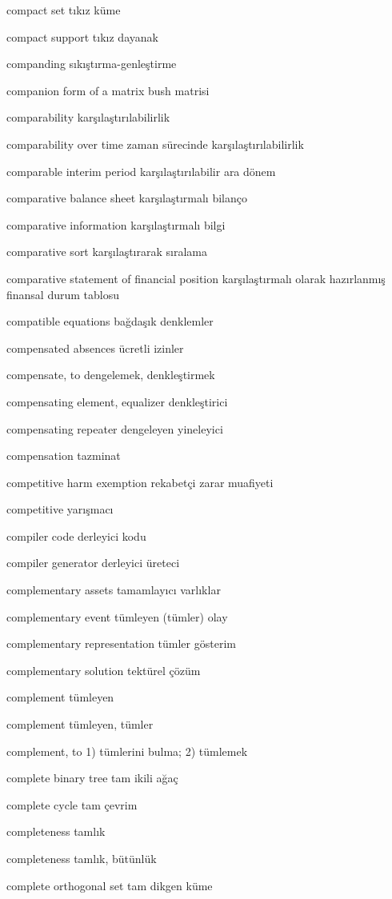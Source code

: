 \documentclass[12pt,fleqn]{article}\usepackage{../../common}
\begin{document}
compact set tıkız küme

compact support tıkız dayanak

companding sıkıştırma-genleştirme

companion form of a matrix bush matrisi

comparability karşılaştırılabilirlik

comparability over time zaman sürecinde karşılaştırılabilirlik

comparable interim period karşılaştırılabilir ara dönem

comparative balance sheet karşılaştırmalı bilanço

comparative information karşılaştırmalı bilgi

comparative sort karşılaştırarak sıralama

comparative statement of financial position karşılaştırmalı olarak hazırlanmış finansal durum tablosu

compatible equations bağdaşık denklemler

compensated absences ücretli izinler

compensate, to dengelemek, denkleştirmek

compensating element, equalizer denkleştirici

compensating repeater dengeleyen yineleyici

compensation tazminat

competitive harm exemption rekabetçi zarar muafiyeti

competitive yarışmacı

compiler code derleyici kodu

compiler generator derleyici üreteci

complementary assets tamamlayıcı varlıklar

complementary event tümleyen (tümler) olay

complementary representation tümler gösterim

complementary solution tektürel çözüm

complement tümleyen

complement tümleyen, tümler

complement, to 1) tümlerini bulma; 2) tümlemek

complete binary tree tam ikili ağaç

complete cycle tam çevrim

completeness tamlık

completeness tamlık, bütünlük

complete orthogonal set tam dikgen küme
\end{document}
